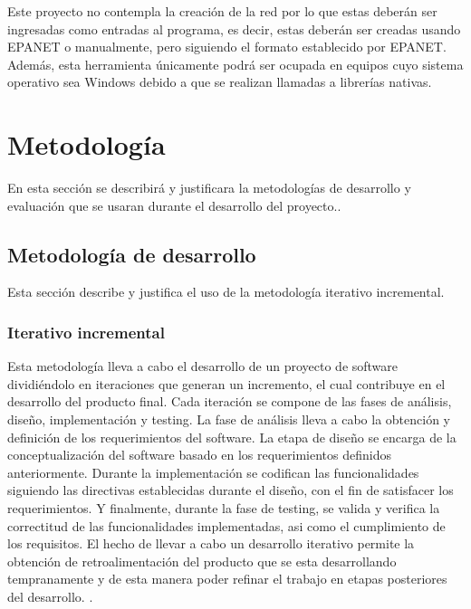 \documentclass[11pt,letterpaper]{article}
\begin{document}
Este proyecto no contempla la creación de la red por lo que estas deberán ser ingresadas como entradas al programa, es decir, estas deberán ser creadas usando EPANET o manualmente, pero siguiendo el formato establecido por EPANET. Además, esta herramienta únicamente podrá ser ocupada en equipos cuyo sistema operativo sea Windows debido a que se realizan llamadas a librerías nativas.


\section{Metodología}

En esta sección se describirá y justificara la metodologías de desarrollo y evaluación que se usaran durante el desarrollo del proyecto.. 
\subsection{Metodología de desarrollo}


Esta sección describe y justifica el uso de la metodología iterativo incremental.
\subsubsection{Iterativo incremental}

Esta metodología lleva a cabo el desarrollo de un proyecto de software dividiéndolo en iteraciones que generan un incremento, el cual contribuye en el desarrollo del producto final. Cada iteración se compone de las fases de análisis, diseño, implementación y testing. La fase de análisis lleva a cabo la obtención y definición de los requerimientos del software. La etapa de diseño se encarga de la conceptualización del software basado en los requerimientos definidos anteriormente. Durante la implementación se codifican las funcionalidades siguiendo las directivas establecidas durante el diseño, con el fin de satisfacer los requerimientos. Y finalmente, durante la fase de testing, se valida y verifica la correctitud de las funcionalidades implementadas, asi como el cumplimiento de los requisitos. El hecho de llevar a cabo un desarrollo iterativo permite la obtención de retroalimentación del producto que se esta desarrollando tempranamente y de esta manera poder refinar el trabajo en etapas posteriores del desarrollo. \cite{Victor2003, Mitchell2009, Martin1999,Alshamrani2015}.
\end{document}
